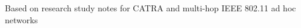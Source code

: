 \begin{frame}[plain]
    \vfill

    \begin{minipage}{0.76\paperwidth}
        \raggedright
        \fontsize{19}{24}\selectfont\bfseries\color{TitleColor}\inserttitle
    \end{minipage}

    \vspace{0.35cm}

    {\fontsize{15}{20}\selectfont\color{SecondaryColor}\insertsubtitle}

    \vspace{0.95cm}

    {\fontsize{12}{15}\selectfont\bfseries\insertauthor}

    \vspace{0.20cm}

    {\fontsize{9}{12}\selectfont\color{SecondaryColor}\insertinstitute}

    \vspace{0.60cm}

    {\fontsize{8}{10}\selectfont\color{SecondaryColor}
    Based on research study notes for CATRA and multi-hop IEEE 802.11 ad hoc networks}

    \vfill
\end{frame}
